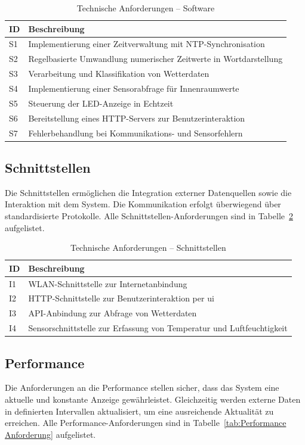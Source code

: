 \begin{table}[H]
\caption{Technische Anforderungen – Software}
\centering
\begin{tabular}{p{0.5cm} p{12cm}}
\textbf{ID} & \textbf{Beschreibung} \\
\hline
S1 & Implementierung einer Zeitverwaltung mit NTP-Synchronisation \\
S2 & Regelbasierte Umwandlung numerischer Zeitwerte in Wortdarstellung \\
S3 & Verarbeitung und Klassifikation von Wetterdaten \\
S4 & Implementierung einer Sensorabfrage für Innenraumwerte \\
S5 & Steuerung der LED-Anzeige in Echtzeit \\
S6 & Bereitstellung eines HTTP-Servers zur Benutzerinteraktion \\
S7 & Fehlerbehandlung bei Kommunikations- und Sensorfehlern \\
\end{tabular}
\label{tab:Software Anforderung}
\end{table}

\subsection{Schnittstellen}
Die Schnittstellen ermöglichen die Integration externer Datenquellen sowie die Interaktion mit dem System.
Die Kommunikation erfolgt überwiegend über standardisierte Protokolle.
Alle Schnittstellen-Anforderungen sind in Tabelle~\ref{tab:Schnittstellen Anforderung} aufgelistet.

\begin{table}[H]
\caption{Technische Anforderungen – Schnittstellen}
\centering
\begin{tabular}{p{0.5cm} p{12.5cm}}
\textbf{ID} & \textbf{Beschreibung} \\
\hline
I1 & WLAN-Schnittstelle zur Internetanbindung \\
I2 & HTTP-Schnittstelle zur Benutzerinteraktion per \gls{ui} \\
I3 & API-Anbindung zur Abfrage von Wetterdaten \\
I4 & Sensorschnittstelle zur Erfassung von Temperatur und Luftfeuchtigkeit \\
\end{tabular}
\label{tab:Schnittstellen Anforderung}
\end{table}

\subsection{Performance}
Die Anforderungen an die Performance stellen sicher, dass das System eine aktuelle und konstante Anzeige gewährleistet.
Gleichzeitig werden externe Daten in definierten Intervallen aktualisiert, um eine ausreichende Aktualität zu erreichen.
Alle Performance-Anforderungen sind in Tabelle~\ref{tab:Performance Anforderung} aufgelistet.

